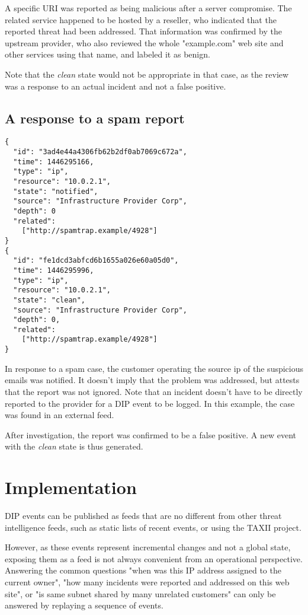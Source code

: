 \documentclass[conference]{IEEEtran}
\begin{document}
A specific URI was reported as being malicious after a server compromise. The related service happened to be hosted by a reseller, who indicated that the reported threat had been addressed. That information was confirmed by the upstream provider, who also reviewed the whole "example.com" web site and other services using that name, and labeled it as benign.

Note that the \emph{clean} state would not be appropriate in that case, as the review was a response to an actual incident and not a false positive.

\subsection{A response to a spam report}

\begin{verbatim}
{
  "id": "3ad4e44a4306fb62b2df0ab7069c672a",
  "time": 1446295166,
  "type": "ip",
  "resource": "10.0.2.1",
  "state": "notified",
  "source": "Infrastructure Provider Corp",
  "depth": 0
  "related":
    ["http://spamtrap.example/4928"]
}
{
  "id": "fe1dcd3abfcd6b1655a026e60a05d0",
  "time": 1446295996,
  "type": "ip",
  "resource": "10.0.2.1",
  "state": "clean",
  "source": "Infrastructure Provider Corp",
  "depth": 0,
  "related":
    ["http://spamtrap.example/4928"]
}	
\end{verbatim}

In response to a spam case, the customer operating the source ip of the suspicious emails was notified. It doesn't imply that the problem was addressed, but attests that the report was not ignored. Note that an incident doesn't have to be directly reported to the provider for a DIP event to be logged. In this example, the case was found in an external feed.

After investigation, the report was confirmed to be a false positive. A new event with the \emph{clean} state is thus generated.

\section{Implementation}

DIP events can be published as feeds that are no different from other threat intelligence feeds, such as static lists of recent events, or using the TAXII project.

However, as these events represent incremental changes and not a global state, exposing them as a feed is not always convenient from an operational perspective. Answering the common questions "when was this IP address assigned to the current owner", "how many incidents were reported and addressed on this web site", or "is same subnet shared by many unrelated customers" can only be answered by replaying a sequence of events.
\end{document}
